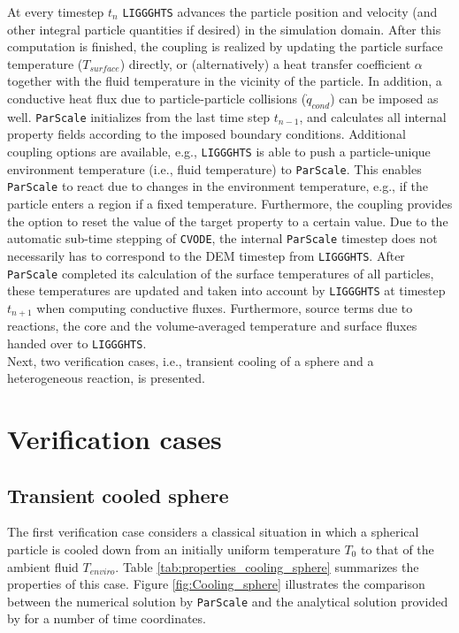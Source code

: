 \documentclass{particles2015}
\begin{document}
At every timestep $t_n$ \texttt{LIGGGHTS}\textsuperscript{\textregistered} advances the particle position and velocity (and other integral particle quantities if desired) in the simulation domain. After this computation is finished, the coupling is realized by updating the particle surface temperature ($T_{surface}$) directly, or (alternatively) a heat transfer coefficient $\alpha$ together with the fluid temperature in the vicinity of the particle. In addition, a conductive heat flux due to particle-particle collisions  ($\dot{q}_{cond}$) can be imposed as well. \texttt{ParScale} initializes from the last time step $t_{n-1}$, and calculates all internal property fields according to the imposed boundary conditions. Additional coupling options are available, e.g., \texttt{LIGGGHTS}\textsuperscript{\textregistered} is able to push a particle-unique environment temperature (i.e., fluid temperature) to \texttt{ParScale}. This enables \texttt{ParScale} to react due to changes in the environment temperature, e.g., if the particle enters a region if a fixed temperature. Furthermore, the coupling provides the option to reset the value of the target property to a certain value. Due to the automatic sub-time stepping of \texttt{CVODE}, the internal \texttt{ParScale} timestep does not necessarily has to correspond to the DEM timestep from \texttt{LIGGGHTS}\textsuperscript{\textregistered}. After \texttt{ParScale} completed its calculation of the surface temperatures of all particles, these temperatures are updated and taken into account by \texttt{LIGGGHTS}\textsuperscript{\textregistered} at timestep $t_{n+1}$ when computing conductive fluxes. Furthermore, source terms due to reactions, the core and the volume-averaged temperature and surface fluxes handed over to \texttt{LIGGGHTS}\textsuperscript{\textregistered}.\\
Next, two verification cases, i.e., transient cooling of a sphere and a heterogeneous reaction, is presented.

\section{Verification cases}
\label{sec:verification_case}

\subsection{Transient cooled sphere}
\label{sec:transient_cooling}
The first verification case considers a classical situation in which a spherical particle is cooled down from an initially uniform temperature $T_0$ to that of the ambient fluid $T_{enviro}$. Table \ref{tab:properties_cooling_sphere} summarizes the properties of this case. Figure \ref{fig:Cooling_sphere} illustrates the comparison between the numerical solution by \texttt{ParScale} and the analytical solution provided by \cite{Crank1975} for a number of time coordinates. 
\end{document}

